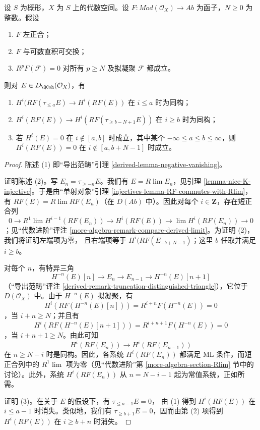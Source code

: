 \begin{lemma}
\label{lemma-application-nice-K-injective}
设 $S$ 为概形，$X$ 为 $S$ 上的代数空间。设
$F : \textit{Mod}(\mathcal{O}_X) \to \textit{Ab}$
为函子，$N \geq 0$ 为整数。假设
\begin{enumerate}
\item $F$ 左正合；
\item $F$ 与可数直积可交换；
\item $R^pF(\mathcal{F}) = 0$ 对所有 $p \geq N$ 及拟凝聚
$\mathcal{F}$ 都成立。
\end{enumerate}
则对 $E \in D_\QCoh(\mathcal{O}_X)$，有
\begin{enumerate}
\item $H^i(RF(\tau_{\leq a}E) \to H^i(RF(E))$ 在
$i \leq a$ 时为同构； %
\item $H^i(RF(E)) \to H^i(RF(\tau_{\geq b - N + 1}E))$ 在
$i \geq b$ 时为同构；
\item 若 $H^i(E) = 0$ 在 $i \not \in [a, b]$ 时成立，其中某个
$-\infty \leq a \leq b \leq \infty$，则 $H^i(RF(E)) = 0$
在 $i \not \in [a, b + N - 1]$ 时成立。
\end{enumerate}
\end{lemma}

\begin{proof}
陈述 (1) 即“导出范畴”引理 \ref{derived-lemma-negative-vanishing}。

\medskip\noindent
证明陈述 (2)。写 $E_n = \tau_{\geq -n}E$。我们有
$E = R\lim E_n$，见引理 \ref{lemma-nice-K-injective}。于是由“单射对象”引理
\ref{injectives-lemma-RF-commutes-with-Rlim}，有
$RF(E) = R\lim RF(E_n)$（在 $D(\textit{Ab})$ 中）。因此对每个
$i \in \mathbf{Z}$，存在短正合列
$$
0 \to R^1\lim H^{i - 1}(RF(E_n)) \to H^i(RF(E)) \to \lim H^i(RF(E_n)) \to 0
$$
；见“代数进阶”评注
\ref{more-algebra-remark-compare-derived-limit}。为证明 (2)，我们将证明左端项为零，
且右端项等于 $H^i(RF(E_{-b + N - 1})$；这里 $b$ 任取并满足
$i \geq b$。 %

\medskip\noindent
对每个 $n$，有特异三角
$$
H^{-n}(E)[n] \to E_n \to E_{n - 1} \to H^{-n}(E)[n + 1]
$$
（“导出范畴”评注
\ref{derived-remark-truncation-distinguished-triangle}），它位于
$D(\mathcal{O}_X)$ 中。由于 $H^{-n}(E)$ 拟凝聚，有
$$
H^i(RF(H^{-n}(E)[n])) = R^{i + n}F(H^{-n}(E)) = 0
$$
，当 $i + n \geq N$；并且有
$$
H^i(RF(H^{-n}(E)[n + 1])) = R^{i + n + 1}F(H^{-n}(E)) = 0
$$
，当 $i + n + 1 \geq N$。由此可知
$$
H^i(RF(E_n)) \to H^i(RF(E_{n - 1}))
$$
在 $n \geq N - i$ 时是同构。因此，各系统 $H^i(RF(E_n))$ 都满足
ML 条件，而短正合列中的 $R^1\lim$ 项为零（见“代数进阶”第
\ref{more-algebra-section-Rlim} 节中的讨论）。此外，系统
$H^i(RF(E_n))$ 从 $n = N - i - 1$ 起为常值系统，正如所需。

\medskip\noindent
证明 (3)。在关于 $E$ 的假设下，有 $\tau_{\leq a - 1}E = 0$，
由 (1) 得到 $H^i(RF(E))$ 在 $i \leq a - 1$ 时消失。类似地，我们有
$\tau_{\geq b + 1}E = 0$，因而由第 (2) 项得到
$H^i(RF(E))$ 在 $i \geq b + n$ 时消失。 %
\end{proof}


